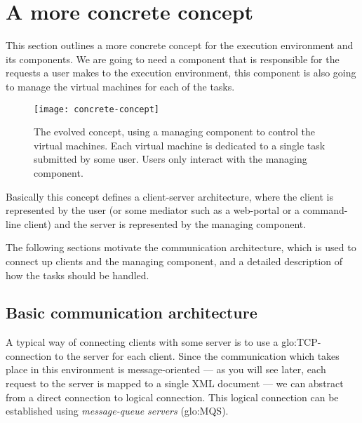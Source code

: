 \section{A more concrete concept}

This  section   outlines  a  more  concrete  concept   for  the  execution
environment and its  components. We are going to need  a component that is
responsible for  the requests a  user makes to the  execution environment,
this component  is also going to  manage the virtual machines  for each of
the tasks.

\begin{figure}[htbp]
  \begin{center}
    \begin{minipage}{.75\textwidth}
      \begin{center}
        \texttt{[image: concrete-concept]}
      \end{center}
      \caption[A  more  concrete  concept]{The  evolved concept,  using  a
        managing component to control  the virtual machines.  Each virtual
        machine  is   dedicated  to  a  single  task   submitted  by  some
        user. Users only interact with the managing component.}
      \label{fig:concrete-concept}
    \end{minipage}
  \end{center}
\end{figure}

Basically  this concept  defines a  client-server architecture,  where the
client is represented  by the user (or some mediator  such as a web-portal
or a  command-line client) and the  server is represented  by the managing
component.

The following  sections motivate the communication  architecture, which is
used  to connect up  clients and  the managing  component, and  a detailed
description of how the tasks should be handled.

\subsection{Basic communication architecture}
\label{sec:basic-communcation-architecture}

A  typical  way  of connecting  clients  with  some  server  is to  use  a
\gls{glo:TCP}-connection  to  the  server  for  each  client.   Since  the
communication which  takes place  in this environment  is message-oriented
--- as  you will  see later,  each request to  the server  is mapped  to a
single  XML document  ---  we can  abstract  from a  direct connection  to
logical  connection.  This  logical  connection can  be established  using
\emph{message-queue servers} (\gls{glo:MQS}).

